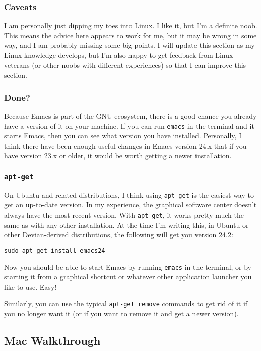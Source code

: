 \documentclass{article}
\begin{document}
\subsubsection{Caveats}
\label{sec-3-3-1}

I am personally just dipping my toes into Linux.  I like it, but I'm a definite noob.  This means the advice here appears to work for me, but it may be wrong in some way, and I am probably missing some big points. I will update this section as my Linux knowledge develops, but I'm also happy to get feedback from Linux veterans (or other noobs with different experiences) so that I can improve this section.
\subsubsection{Done?}
\label{sec-3-3-2}

Because Emacs is part of the GNU ecosystem, there is a good chance you already have a version of it on your machine.  If you can run \texttt{emacs} in the terminal and it starts Emacs, then you can see what version you have installed.  Personally, I think there have been enough useful changes in Emacs version 24.x that if you have version 23.x or older, it would be worth getting a newer installation.
\subsubsection{\texttt{apt-get}}
\label{sec-3-3-3}

On Ubuntu and related distributions, I think using \texttt{apt-get} is the easiest way to get an up-to-date version. In my experience, the graphical software center doesn't always have the most recent version.  With \texttt{apt-get}, it works pretty much the same as with any other installation.  At the time I'm writing this, in Ubuntu or other Devian-derived distributions, the following will get you version 24.2:


\begin{verbatim}
sudo apt-get install emacs24
\end{verbatim}

Now you should be able to start Emacs by running \texttt{emacs} in the terminal, or by starting it from a graphical shortcut or whatever other application launcher you like to use.  Easy!

Similarly, you can use the typical \texttt{apt-get remove} commands to get rid of it if you no longer want it (or if you want to remove it and get a newer version).
\subsection{Mac Walkthrough}
\label{sec-3-4}
\end{document}
